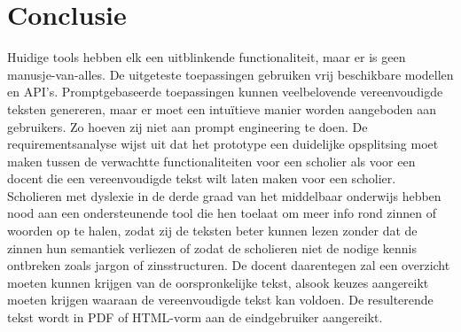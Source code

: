\begin{table}[H]
	\centering
\end{table}

\section{Conclusie}

Huidige tools hebben elk een uitblinkende functionaliteit, maar er is geen manusje-van-alles. De uitgeteste toepassingen gebruiken vrij beschikbare modellen en API's. Promptgebaseerde toepassingen kunnen veelbelovende vereenvoudigde teksten genereren, maar er moet een intuïtieve manier worden aangeboden aan gebruikers. Zo hoeven zij niet aan prompt engineering te doen. De requirementsanalyse wijst uit dat het prototype een duidelijke opsplitsing moet maken tussen de verwachtte functionaliteiten voor een scholier als voor een docent die een vereenvoudigde tekst wilt laten maken voor een scholier. Scholieren met dyslexie in de derde graad van het middelbaar onderwijs hebben nood aan een ondersteunende tool die hen toelaat om meer info rond zinnen of woorden op te halen, zodat zij de teksten beter kunnen lezen zonder dat de zinnen hun semantiek verliezen of zodat de scholieren niet de nodige kennis ontbreken zoals jargon of zinsstructuren. De docent daarentegen zal een overzicht moeten kunnen krijgen van de oorspronkelijke tekst, alsook keuzes aangereikt moeten krijgen waaraan de vereenvoudigde tekst kan voldoen. De resulterende tekst wordt in PDF of HTML-vorm aan de eindgebruiker aangereikt.

